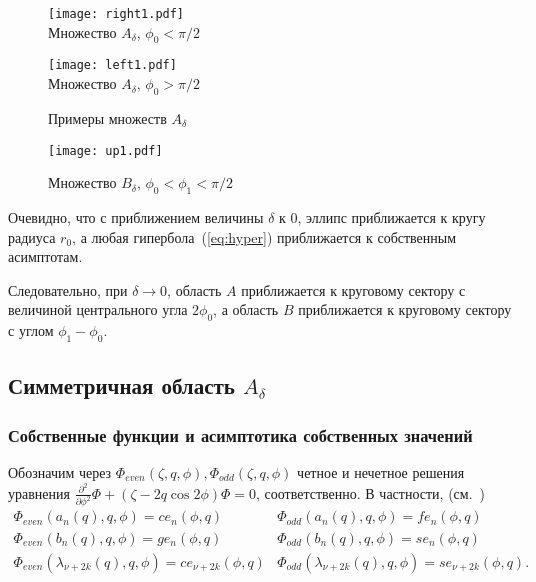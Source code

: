 \begin{figure}[ht]
    \begin{minipage}[b][][b]{0.49\linewidth}\centering
        \texttt{[image: right1.pdf]} \\ 
        Множество $A_\delta$, $\phi_0<\pi/2$
    \end{minipage}
    \hfill
    \begin{minipage}[b][][b]{0.49\linewidth}\centering
        \texttt{[image: left1.pdf]} \\ 
        Множество $A_\delta$, $\phi_0>\pi/2$
    \end{minipage}
\caption{Примеры множеств $A_\delta$}
\end{figure}

\begin{figure}[ht]
\begin{minipage}{0.9\linewidth}\centering
        \texttt{[image: up1.pdf]}  
    \end{minipage}
\caption{        Множество $B_\delta$, $\phi_0<\phi_1<\pi/2$}
\end{figure}

Очевидно, что с приближением величины $\delta$ к 0, эллипс приближается к кругу радиуса $r_0$,
а любая гипербола~(\ref{eq:hyper}) приближается к собственным асимптотам.

Следовательно, при $\delta \to 0$, область $A$ приближается к круговому сектору с величиной центрального угла $2\phi_0$, 
а область  $B$ приближается к круговому сектору с углом $\phi_1-\phi_0$. 


\subsection{Симметричная область $A_\delta$}\label{sec:ch2/sec2/sub1}
\subsubsection{Собственные функции и асимптотика собственных значений}\label{sec:ch2/sec2/sub1/sub1}

Обозначим через $\Phi_{even}(\zeta, q, \phi), \Phi_{odd}(\zeta, q, \phi)$ четное и нечетное решения уравнения $\frac{\partial^2}{\partial \phi^2}\Phi + (\zeta - 2q\cos{2\phi})\Phi = 0$, соответственно. 
В частности, (см.~\cite{wref2})
\[
\begin{array}{ll}
    \Phi_{even}(a_n(q), q, \phi) = ce_n(\phi, q)	&
    \Phi_{odd}(a_n(q), q, \phi) = fe_n(\phi, q)\\
    \Phi_{even}(b_n(q), q, \phi) = ge_n(\phi, q)	&
    \Phi_{odd}(b_n(q), q, \phi) = se_n(\phi, q)\\
    \Phi_{even}(\lambda_{\nu+2k}(q), q, \phi) = ce_{\nu+2k}(\phi, q) 	&
    \Phi_{odd}(\lambda_{\nu+2k}(q), q, \phi) = se_{\nu+2k}(\phi, q).
\end{array}
\]

